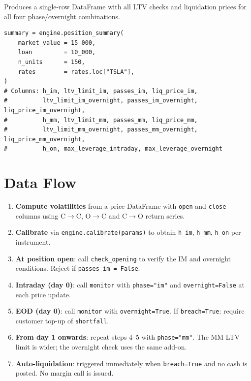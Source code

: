\documentclass[9pt, a4paper]{extarticle}
\begin{document}
Produces a single-row DataFrame with all LTV checks and liquidation prices for
all four phase/overnight combinations.

\begin{lstlisting}
summary = engine.position_summary(
    market_value = 15_000,
    loan         = 10_000,
    n_units      = 150,
    rates        = rates.loc["TSLA"],
)
# Columns: h_im, ltv_limit_im, passes_im, liq_price_im,
#          ltv_limit_im_overnight, passes_im_overnight, liq_price_im_overnight,
#          h_mm, ltv_limit_mm, passes_mm, liq_price_mm,
#          ltv_limit_mm_overnight, passes_mm_overnight, liq_price_mm_overnight,
#          h_on, max_leverage_intraday, max_leverage_overnight
\end{lstlisting}

\section{Data Flow}
\label{sec:dataflow}

\begin{enumerate}[leftmargin=2em]
    \item \textbf{Compute volatilities} from a price DataFrame with \texttt{open}
          and \texttt{close} columns using C$\to$C, O$\to$C and C$\to$O return series.
    \item \textbf{Calibrate} via \texttt{engine.calibrate(params)} to obtain
          \texttt{h\_im}, \texttt{h\_mm}, \texttt{h\_on} per instrument.
    \item \textbf{At position open}: call \texttt{check\_opening} to verify the IM
          and overnight conditions. Reject if \texttt{passes\_im = False}.
    \item \textbf{Intraday (day 0)}: call \texttt{monitor} with \texttt{phase="im"}
          and \texttt{overnight=False} at each price update.
    \item \textbf{EOD (day 0)}: call \texttt{monitor} with \texttt{overnight=True}.
          If \texttt{breach=True}: require customer top-up of \texttt{shortfall}.
    \item \textbf{From day 1 onwards}: repeat steps 4–5 with \texttt{phase="mm"}.
          The MM LTV limit is wider; the overnight check uses the same add-on.
    \item \textbf{Auto-liquidation}: triggered immediately when \texttt{breach=True}
          and no cash is posted. No margin call is issued.
\end{enumerate}
\end{document}
